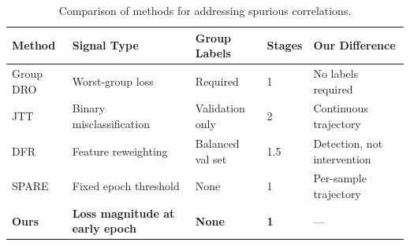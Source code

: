 \begin{table}[h]
\centering
\begin{tabular}{@{}lllll@{}}
\toprule
Method & Signal Type & Group Labels & Stages & Our Difference \\
\midrule
Group DRO & Worst-group loss & Required & 1 & No labels required \\
JTT & Binary misclassification & Validation only & 2 & Continuous trajectory \\
DFR & Feature reweighting & Balanced val set & 1.5 & Detection, not intervention \\
SPARE & Fixed epoch threshold & None & 1 & Per-sample trajectory \\
\textbf{Ours} & \textbf{Loss magnitude at early epoch} & \textbf{None} & \textbf{1} & --- \\
\bottomrule
\end{tabular}
\caption{Comparison of methods for addressing spurious correlations.}
\label{tab:positioning}
\end{table}
